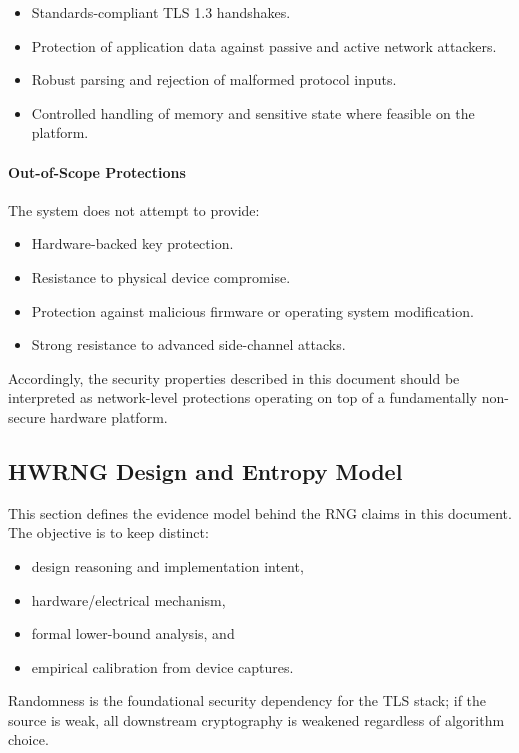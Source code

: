 \documentclass[titlepage]{report}
\begin{document}
	\begin{itemize}
		\item Standards-compliant TLS 1.3 handshakes.
		\item Protection of application data against passive and active network attackers.
		\item Robust parsing and rejection of malformed protocol inputs.
		\item Controlled handling of memory and sensitive state where feasible on the platform.
	\end{itemize}
	
	\paragraph{Out-of-Scope Protections}
	
	The system does not attempt to provide:
	
	\begin{itemize}
		\item Hardware-backed key protection.
		\item Resistance to physical device compromise.
		\item Protection against malicious firmware or operating system modification.
		\item Strong resistance to advanced side-channel attacks.
	\end{itemize}
	
	Accordingly, the security properties described in this document should be interpreted as network-level protections operating on top of a fundamentally non-secure hardware platform.
	
	\subsection{HWRNG Design and Entropy Model}
	\label{sec:entropy}
	\label{ssec:entropy}
	
	This section defines the evidence model behind the RNG claims in this document. The objective is to keep distinct:
	\begin{itemize}
		\item design reasoning and implementation intent,
		\item hardware/electrical mechanism,
		\item formal lower-bound analysis, and
		\item empirical calibration from device captures.
	\end{itemize}
	
	Randomness is the foundational security dependency for the TLS stack; if the source is weak, all downstream cryptography is weakened regardless of algorithm choice.
	
\end{document}
